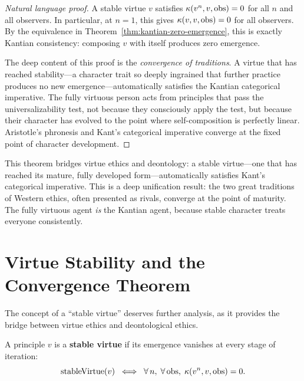 \begin{proof}[Natural language proof]
A stable virtue $v$ satisfies $\kappa(v^n, v, \mathrm{obs}) = 0$ for all
$n$ and all observers. In particular, at $n = 1$, this gives
$\kappa(v, v, \mathrm{obs}) = 0$ for all observers. By the equivalence
in Theorem~\ref{thm:kantian-zero-emergence}, this is exactly Kantian
consistency: composing $v$ with itself produces zero emergence.

The deep content of this proof is the \emph{convergence of traditions}.
A virtue that has reached stability---a character trait so deeply ingrained
that further practice produces no new emergence---automatically satisfies
the Kantian categorical imperative. The fully virtuous person acts from
principles that pass the universalizability test, not because they
consciously apply the test, but because their character has evolved to
the point where self-composition is perfectly linear. Aristotle's
phronesis and Kant's categorical imperative converge at the fixed point
of character development.
\end{proof}

\begin{interpretation}
This theorem bridges virtue ethics and deontology: a stable virtue---one that
has reached its mature, fully developed form---automatically satisfies Kant's
categorical imperative. This is a deep unification result: the two great
traditions of Western ethics, often presented as rivals, converge at the point
of maturity. The fully virtuous agent \emph{is} the Kantian agent, because
stable character treats everyone consistently.
\end{interpretation}

\section{Virtue Stability and the Convergence Theorem}
\label{sec:virtue-stability}

The concept of a ``stable virtue'' deserves further analysis, as it provides
the bridge between virtue ethics and deontological ethics.

\begin{definition}
\label{def:stable-virtue}
A principle $v$ is a \textbf{stable virtue} if its emergence vanishes at
every stage of iteration:
\[
  \mathrm{stableVirtue}(v) \;\iff\; \forall\, n,\; \forall\, \mathrm{obs},\;
  \kappa(v^n, v, \mathrm{obs}) = 0.
\]
\end{definition}

